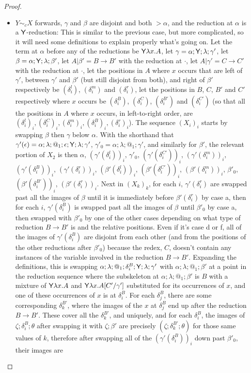 \begin{proof}
\begin{itemize}
\item $Y \sim_c X$ forwards, $\gamma$ and $\beta$ are disjoint and both $> \alpha$, and the reduction at $\alpha$ is a $\mathsf{Y}$-reduction: This is similar to the previous case, but more complicated, so it will need some definitions to explain properly what's going on. Let the term at $\alpha$ before any of the reductions be $\mathsf{Y} \lambda x. A$, let $\gamma = \alpha;\mathsf{Y};\lambda;\gamma'$, let $\beta = \alpha;\mathsf{Y};\lambda;\beta'$, let $A | \beta' = B \to B'$ with the reduction at $\cdot$, let $A | \gamma' = C \to C'$ with the reduction at $\cdot$, let the positions in $A$ where $x$ occurs that are left of $\gamma'$, between $\gamma'$ and $\beta'$ (but still disjoint from both), and right of $\beta'$ respectively be $(\delta^l_i)$, $(\delta^m_i)$ and $(\delta^r_i)$, let the positions in $B$, $C$, $B'$ and $C'$ respectively where $x$ occurs be $(\delta^B_i)$, $(\delta^C_i)$, $(\delta^{B'}_i)$ and $(\delta^{C'}_i)$ (so that all the positions in $A$ where $x$ occurs, in left-to-right order, are $(\delta^l_i)_i, (\delta^C_i)_i, (\delta^m_i)_i, (\delta^B_i)_i, (\delta^r_i)_i$). The sequence $(X_i)_i$ starts by swapping $\beta$ then $\gamma$ below $\alpha$. With the shorthand that $\gamma'(\epsilon) = \alpha;\lambda;@_1;\epsilon;\mathsf{Y};\lambda;\gamma'$, $\gamma'_0 = \alpha;\lambda;@_1;\gamma'$, and similarly for $\beta'$, the relevant portion of $X_2$ is then $\alpha$, $(\gamma'(\delta^l_i))_i$, $\gamma'_0$, $(\gamma'(\delta^{C'}_i))_i$, $(\gamma'(\delta^m_i))_i$, $(\gamma'(\delta^B_i))_i$, $(\gamma'(\delta^r_i))_i$, $(\beta'(\delta^l_i))_i$, $(\beta'(\delta^{C'}_i))_i$, $(\beta'(\delta^m_i))_i$, $\beta'_0$, $(\beta'(\delta^{B'}_i))_i$, $(\beta'(\delta^r_i))_i$. Next in $(X_k)_k$, for each $i$, $\gamma'(\delta^r_i)$ are swapped past all the images of $\beta$ until it is immediately before $\beta'(\delta^r_i)$ by case a, then for each $i$, $\gamma'(\delta^B_i)$ is swapped past all the images of $\beta$ until $\beta'_0$ by case a, then swapped with $\beta'_0$ by one of the other cases depending on what type of reduction $B \to B'$ is and the relative positions. Even if it's case d or f, all of the images of $\gamma'(\delta^B_i)$ are disjoint from each other (and from the positions of the other reductions after $\beta'_0$) because the redex, $C$, doesn't contain any instances of the variable involved in the reduction $B \to B'$. Expanding the definitions, this is swapping $\alpha;\lambda;@_1;\delta^B_i;\mathsf{Y};\lambda;\gamma'$ with $\alpha;\lambda;@_1;\beta'$ at a point in the reduction sequence where the subskeleton at $\alpha;\lambda;@_1;\beta'$ is $B$ with a mixture of $\mathsf{Y} \lambda x. A$ and $\mathsf{Y} \lambda x. A[C'/\gamma']$ substituted for its occurrences of $x$, and one of these occurrences of $x$ is at $\delta^B_i$. For each $\delta^B_j$, there are some corresponding $\delta^{B'}_k$, where the images of the $x$ at $\delta^B_j$ end up after the reduction $B \to B'$. These cover all the $\delta^{B'}_k$, and uniquely, and for each $\delta^B_i$, the images of $\zeta;\delta^B_i;\theta$ after swapping it with $\zeta;\beta'$ are precisely $(\zeta;\delta^{B'}_k;\theta)$ for those same values of $k$, therefore after swapping all of the $(\gamma'(\delta^B_i))_i$ down past $\beta'_0$, their images are 
\end{itemize}
\end{proof}
